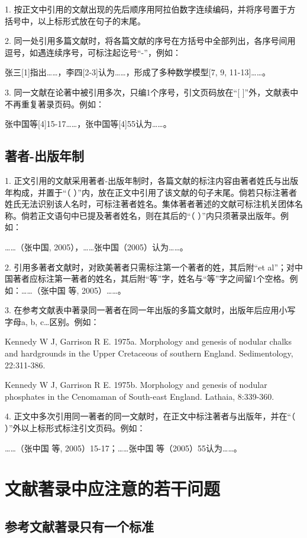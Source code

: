 1. 按正文中引用的文献出现的先后顺序用阿拉伯数字连续编码，并将序号置于方括号中，以上标形式放在句子的末尾。

2. 同一处引用多篇文献时，将各篇文献的序号在方括号中全部列出，各序号间用逗号，如遇连续序号，可标注起讫号“-”，例如：

张三[1]指出……，李四[2-3]认为……，形成了多种数学模型[7, 9, 11-13]……。

3. 同一文献在论著中被引用多次，只编1个序号，引文页码放在“[  ]”外，文献表中不再重复著录页码。例如：

张中国等[4]15-17……，张中国等[4]55认为……。

\subsection{著者-出版年制}

1. 正文引用的文献采用著者-出版年制时，各篇文献的标注内容由著者姓氏与出版年构成，并置于“（  ）”内，放在正文中引用了该文献的句子末尾。倘若只标注著者姓氏无法识别该人名时，可标注著者姓名。集体著者著述的文献可标注机关团体名称。倘若正文语句中已提及著者姓名，则在其后的“（  ）”内只须著录出版年。例如：

……（张中国, 2005），……张中国（2005）认为……。

2. 引用多著者文献时，对欧美著者只需标注第一个著者的姓，其后附“et al”；对中国著者应标注第一著者的姓名，其后附“等”字，姓名与“等”字之间留1个空格。例如：……（张中国 等, 2005）……。

3. 在参考文献表中著录同一著者在同一年出版的多篇文献时，出版年后应用小写字母a, b, c…区别。例如：

Kennedy W J, Garrison R E. 1975a. Morphology and genesis of nodular chalks and hardgrounds in the Upper Cretaceous of southern England. Sedimentology, 22:311-386.

Kennedy W J, Garrison R E. 1975b. Morphology and genesis of nodular phosphates in the Cenomaman of South-east England. Lathaia, 8:339-360.

4. 正文中多次引用同一著者的同一文献时，在正文中标注著者与出版年，并在“（  ）”外以上标形式标注引文页码。例如：

……（张中国 等, 2005）15-17；……张中国 等（2005）55认为……。

\section{文献著录中应注意的若干问题}

\subsection{参考文献著录只有一个标准}

